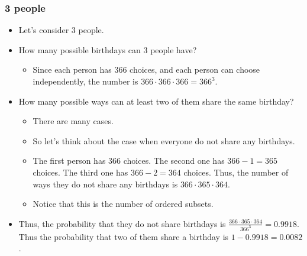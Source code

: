 \begin{frame}\frametitle{3 people}
  \begin{itemize}
  \item Let's consider $3$ people.
    \pause
  \item How many possible birthdays can $3$ people have? \pause
    \begin{itemize}
    \item Since each person has $366$ choices, and each person can
      choose independently, the number is $366\cdot 366\cdot 366=366^3$.
    \end{itemize}
    \pause
  \item How many possible ways can at least two of them share the same
    birthday?  \pause
    \begin{itemize}
    \item There are many cases. \pause
    \item So let's think about the case when everyone do not share any
      birthdays.
    \item The first person has $366$ choices.  \pause The second one
      has $366 - 1 = 365$ choices.  \pause The third one has $366 - 2
      = 364$ choices. \pause Thus, the number of ways they do not
      share any birthdays is $366\cdot 365\cdot 364$. \pause
    \item Notice that this is the number of ordered subsets. \pause
    \end{itemize}
    \pause
  \item Thus, the probability that they do not share birthdays is
    $\frac{366\cdot 365\cdot 364}{366^3} = 0.9918$.  Thus the
    probability that two of them share a birthday is $1-0.9918 =
    0.0082$.
  \end{itemize}
\end{frame}

